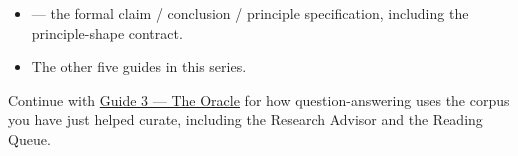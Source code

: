 \documentclass[11pt]{article}
\begin{document}
\begin{itemize}[leftmargin=*,itemsep=0.2em]
  \item {} --- the formal
        claim / conclusion / principle specification, including the
        principle-shape contract.
  \item The other five guides in this series.
\end{itemize}

\begin{nextup}
Continue with \href{03_The_Oracle.pdf}{Guide 3 --- The Oracle} for how
question-answering uses the corpus you have just helped curate,
including the Research Advisor and the Reading Queue.
\end{nextup}
\end{document}
